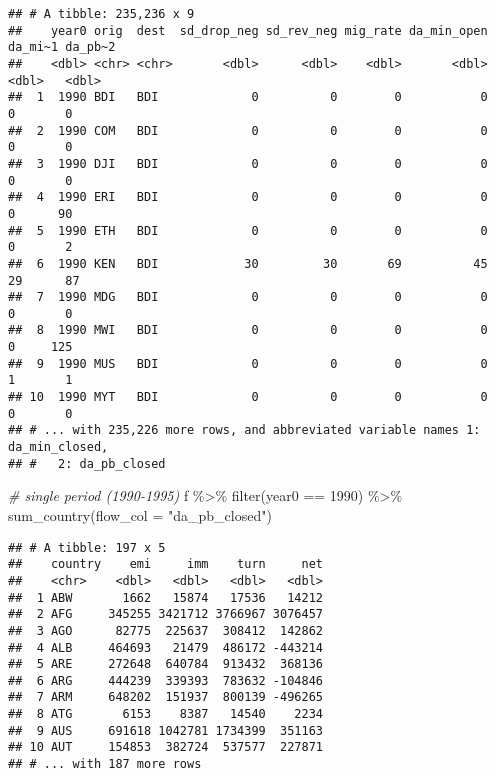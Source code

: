 \documentclass[
]{book}
\newenvironment{Shaded}{\begin{snugshade}}{\end{snugshade}}
\newcommand{\AttributeTok}[1]{\textcolor[rgb]{0.77,0.63,0.00}{#1}}
\newcommand{\CommentTok}[1]{\textcolor[rgb]{0.56,0.35,0.01}{\textit{#1}}}
\newcommand{\DecValTok}[1]{\textcolor[rgb]{0.00,0.00,0.81}{#1}}
\newcommand{\FunctionTok}[1]{\textcolor[rgb]{0.00,0.00,0.00}{#1}}
\newcommand{\NormalTok}[1]{#1}
\newcommand{\SpecialCharTok}[1]{\textcolor[rgb]{0.00,0.00,0.00}{#1}}
\newcommand{\StringTok}[1]{\textcolor[rgb]{0.31,0.60,0.02}{#1}}
\begin{document}
\begin{verbatim}
## # A tibble: 235,236 x 9
##    year0 orig  dest  sd_drop_neg sd_rev_neg mig_rate da_min_open da_mi~1 da_pb~2
##    <dbl> <chr> <chr>       <dbl>      <dbl>    <dbl>       <dbl>   <dbl>   <dbl>
##  1  1990 BDI   BDI             0          0        0           0       0       0
##  2  1990 COM   BDI             0          0        0           0       0       0
##  3  1990 DJI   BDI             0          0        0           0       0       0
##  4  1990 ERI   BDI             0          0        0           0       0      90
##  5  1990 ETH   BDI             0          0        0           0       0       2
##  6  1990 KEN   BDI            30         30       69          45      29      87
##  7  1990 MDG   BDI             0          0        0           0       0       0
##  8  1990 MWI   BDI             0          0        0           0       0     125
##  9  1990 MUS   BDI             0          0        0           0       1       1
## 10  1990 MYT   BDI             0          0        0           0       0       0
## # ... with 235,226 more rows, and abbreviated variable names 1: da_min_closed,
## #   2: da_pb_closed
\end{verbatim}

\begin{Shaded}
\begin{Highlighting}[]
\CommentTok{\# single period (1990{-}1995)}
\NormalTok{f }\SpecialCharTok{\%\textgreater{}\%}
  \FunctionTok{filter}\NormalTok{(year0 }\SpecialCharTok{==} \DecValTok{1990}\NormalTok{) }\SpecialCharTok{\%\textgreater{}\%}
  \FunctionTok{sum\_country}\NormalTok{(}\AttributeTok{flow\_col =} \StringTok{"da\_pb\_closed"}\NormalTok{)}
\end{Highlighting}
\end{Shaded}

\begin{verbatim}
## # A tibble: 197 x 5
##    country    emi     imm    turn     net
##    <chr>    <dbl>   <dbl>   <dbl>   <dbl>
##  1 ABW       1662   15874   17536   14212
##  2 AFG     345255 3421712 3766967 3076457
##  3 AGO      82775  225637  308412  142862
##  4 ALB     464693   21479  486172 -443214
##  5 ARE     272648  640784  913432  368136
##  6 ARG     444239  339393  783632 -104846
##  7 ARM     648202  151937  800139 -496265
##  8 ATG       6153    8387   14540    2234
##  9 AUS     691618 1042781 1734399  351163
## 10 AUT     154853  382724  537577  227871
## # ... with 187 more rows
\end{verbatim}
\end{document}
